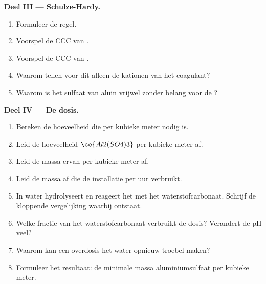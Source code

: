\begin{problem}
\medskip\noindent\textbf{Deel III --- Schulze-Hardy.}
\begin{enumerate}[resume]
  \item Formuleer de regel.
  \item Voorspel de CCC van .
  \item Voorspel de CCC van .
  \item Waarom tellen voor dit  alleen de kationen van het
        coagulant?
  \item Waarom is het sulfaat van aluin vrijwel zonder belang voor de
        ?
\end{enumerate}

\medskip\noindent\textbf{Deel IV --- De dosis.}
\begin{enumerate}[resume]
  \item Bereken de hoeveelheid  die per kubieke meter nodig is.
  \item Leid de hoeveelheid $\ce{Al2(SO4)3}$ per kubieke meter af.
  \item Leid de massa ervan per kubieke meter af.
  \item Leid de massa af die de installatie per uur verbruikt.
  \item In water hydrolyseert  en reageert het met het waterstofcarbonaat. Schrijf de
        kloppende vergelijking waarbij  ontstaat.
  \item Welke fractie van het waterstofcarbonaat verbruikt de dosis?
        Verandert de pH veel?
  \item Waarom kan een overdosis het water opnieuw troebel maken?
  \item Formuleer het resultaat: de minimale massa aluminiumsulfaat per
        kubieke meter.
\end{enumerate}
\end{problem}
